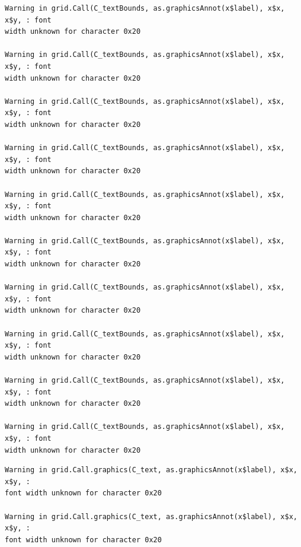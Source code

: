 \documentclass[
  letterpaper,
  DIV=11,
  numbers=noendperiod,
  oneside]{scrartcl}
\begin{document}
\begin{verbatim}
Warning in grid.Call(C_textBounds, as.graphicsAnnot(x$label), x$x, x$y, : font
width unknown for character 0x20

Warning in grid.Call(C_textBounds, as.graphicsAnnot(x$label), x$x, x$y, : font
width unknown for character 0x20

Warning in grid.Call(C_textBounds, as.graphicsAnnot(x$label), x$x, x$y, : font
width unknown for character 0x20

Warning in grid.Call(C_textBounds, as.graphicsAnnot(x$label), x$x, x$y, : font
width unknown for character 0x20

Warning in grid.Call(C_textBounds, as.graphicsAnnot(x$label), x$x, x$y, : font
width unknown for character 0x20

Warning in grid.Call(C_textBounds, as.graphicsAnnot(x$label), x$x, x$y, : font
width unknown for character 0x20

Warning in grid.Call(C_textBounds, as.graphicsAnnot(x$label), x$x, x$y, : font
width unknown for character 0x20

Warning in grid.Call(C_textBounds, as.graphicsAnnot(x$label), x$x, x$y, : font
width unknown for character 0x20

Warning in grid.Call(C_textBounds, as.graphicsAnnot(x$label), x$x, x$y, : font
width unknown for character 0x20

Warning in grid.Call(C_textBounds, as.graphicsAnnot(x$label), x$x, x$y, : font
width unknown for character 0x20
\end{verbatim}

\begin{verbatim}
Warning in grid.Call.graphics(C_text, as.graphicsAnnot(x$label), x$x, x$y, :
font width unknown for character 0x20

Warning in grid.Call.graphics(C_text, as.graphicsAnnot(x$label), x$x, x$y, :
font width unknown for character 0x20
\end{verbatim}
\end{document}
